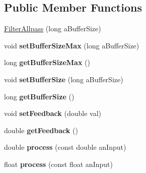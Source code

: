 \subsection*{Public Member Functions}
\begin{DoxyCompactItemize}
\item 
\hyperlink{class_filter_allpass_a7bad6e9dd0bc3e2a8e67a6ba287243e9}{Filter\-Allpass} (long a\-Buffer\-Size)
\item 
\hypertarget{class_filter_allpass_a8dff846eca0d606c07a91b348b265372}{void {\bfseries set\-Buffer\-Size\-Max} (long a\-Buffer\-Size)}\label{class_filter_allpass_a8dff846eca0d606c07a91b348b265372}

\item 
\hypertarget{class_filter_allpass_accafa192c6264a5e080b68835feabab9}{long {\bfseries get\-Buffer\-Size\-Max} ()}\label{class_filter_allpass_accafa192c6264a5e080b68835feabab9}

\item 
\hypertarget{class_filter_allpass_a8f5ad43d883643d482c65541e65548ba}{void {\bfseries set\-Buffer\-Size} (long a\-Buffer\-Size)}\label{class_filter_allpass_a8f5ad43d883643d482c65541e65548ba}

\item 
\hypertarget{class_filter_allpass_aff058f1fe7aea8c09ef31ca2f61915ce}{long {\bfseries get\-Buffer\-Size} ()}\label{class_filter_allpass_aff058f1fe7aea8c09ef31ca2f61915ce}

\item 
\hypertarget{class_filter_allpass_a4449cf1c74613e5dfddceb6f611b2793}{void {\bfseries set\-Feedback} (double val)}\label{class_filter_allpass_a4449cf1c74613e5dfddceb6f611b2793}

\item 
\hypertarget{class_filter_allpass_a8d25f65d21b66d617fe5239479311d17}{double {\bfseries get\-Feedback} ()}\label{class_filter_allpass_a8d25f65d21b66d617fe5239479311d17}

\item 
\hypertarget{class_filter_allpass_a205d78909b64f59f68246e1c1841ee21}{double {\bfseries process} (const double an\-Input)}\label{class_filter_allpass_a205d78909b64f59f68246e1c1841ee21}

\item 
\hypertarget{class_filter_allpass_aac8495bc5fc5c01ec3c5767447e281cf}{float {\bfseries process} (const float an\-Input)}\label{class_filter_allpass_aac8495bc5fc5c01ec3c5767447e281cf}

\end{DoxyCompactItemize}
